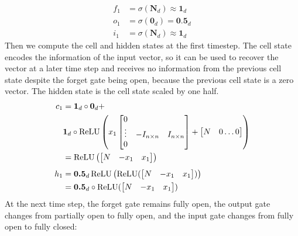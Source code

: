 %
\begin{align*}
  f_1 &= \sigma(\textbf{N}_d) \approx \textbf{1}_d \\
  o_1 &= \sigma(\textbf{0}_d) = \textbf{0.5}_d \\
  i_1 &=  \sigma(\textbf{N}_d) \approx \textbf{1}_d
\end{align*}
%
Then we compute the cell and hidden states at the first timestep. The cell state encodes the information of the input vector, so it can be used to recover the vector at a later time step and receives no information from the previous cell state despite the forget gate being open, because the previous cell state is a zero vector. The hidden state is the cell state scaled by one half.
%
\begin{align*}
  c_1 &= \textbf{1}_d\circ \textbf{0}_d+ \\
      & \textbf{1}_d \circ \operatorname{ReLU}\left(x_1\begin{bmatrix} 0 &  & \\ \vdots & -I_{n \times n} & I_{n \times n}\\ 0 & &  \end{bmatrix} + \begin{bmatrix} N & 0 \dots 0\end{bmatrix}\right) \\
      & = \operatorname{ReLU}\left( \begin{bmatrix} N & -x_1 & x_1 \end{bmatrix}\right) \\[1ex]
  h_1 &= \textbf{0.5}_d\operatorname{ReLU} \left(\operatorname{ReLU}( \begin{bmatrix} N & -x_1 & x_1 \end{bmatrix})\right) \\
      &= \textbf{0.5}_d\circ \operatorname{ReLU}( \begin{bmatrix} N & -x_1 & x_1 \end{bmatrix})
\end{align*}
%
At the next time step, the forget gate remains fully open, the output gate changes from partially open to fully open, and the input gate changes from fully open to fully closed:
%
